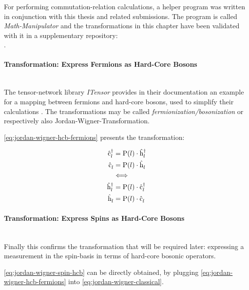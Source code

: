 For performing commutation-relation calculations, a helper program was written in conjunction with this thesis and related submissions.
The program is called \emph{Math-Manipulator} \cite{selfMathManipulator} and the transformations in this chapter have been validated with it in a supplementary repository:\\ .


\paragraph{Transformation: Express Fermions as Hard-Core Bosons}\makebox{}\\
The tensor-network library \emph{ITensor} provides in their documentation an example for a mapping between fermions and hard-core bosons, used to simplify their calculations \cite{itensorFermionizationLibrary}.
The transformations may be called \emph{fermionization/bosonization} or respectively also Jordan-Wigner-Transformation.

\autoref{eq:jordan-wigner-hcb-fermions} presents the transformation:

\begin{equation}
    \label{eq:jordan-wigner-hcb-fermions}
    \begin{split}
        \hat{\text{c}}^{\dagger }_{l} &= \text{P}(l) \cdot \hat{\text{h}}^{\dagger }_{l}\\
        \hat{\text{c}}^{ }_{l} &= \text{P}(l) \cdot \hat{\text{h}}^{ }_{l}\\
        &\Longleftrightarrow \\
        \hat{\text{h}}^{\dagger }_{l} &= \text{P}(l) \cdot \hat{\text{c}}^{\dagger }_{l}\\
        \hat{\text{h}}^{ }_{l} &= \text{P}(l) \cdot \hat{\text{c}}^{ }_{l}\\
    \end{split}
\end{equation}

\paragraph{Transformation: Express Spins as Hard-Core Bosons}\makebox{}\\
Finally this confirms the transformation that will be required later: expressing a measurement in the spin-basis in terms of hard-core bosonic operators.

\autoref{eq:jordan-wigner-spin-hcb} can be directly obtained, by plugging \autoref{eq:jordan-wigner-hcb-fermions} into \autoref{eq:jordan-wigner-classical}.


